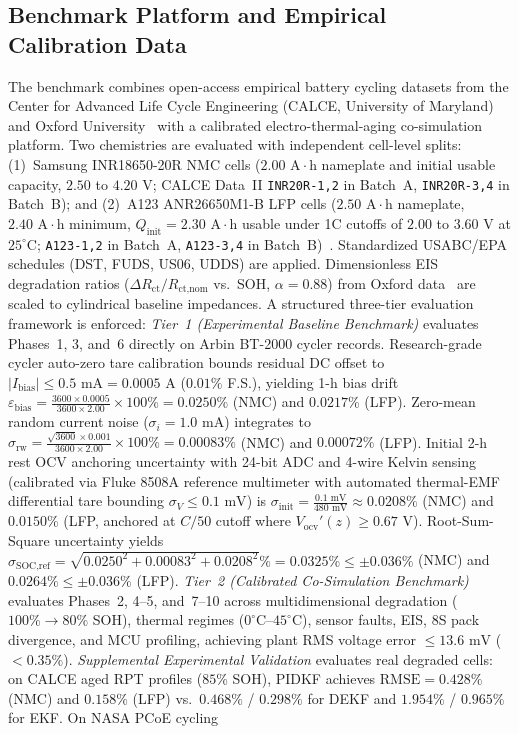 \documentclass[preprint,12pt]{elsarticle}
\begin{document}
\subsection{Benchmark Platform and Empirical Calibration Data}
The benchmark combines open-access empirical battery cycling datasets from the Center for Advanced Life Cycle Engineering (CALCE, University of Maryland)~\cite{Pecht2011calce} and Oxford University~\cite{Birkl2017diagnostics} with a calibrated electro-thermal-aging co-simulation platform. Two chemistries are evaluated with independent cell-level splits: (1)~Samsung INR18650-20R NMC cells ($2.00\text{ A}\cdot\text{h}$ nameplate and initial usable capacity, $2.50$ to $4.20\text{ V}$; CALCE Data~II \texttt{INR20R-1,2} in Batch~A, \texttt{INR20R-3,4} in Batch~B); and (2)~A123 ANR26650M1-B LFP cells ($2.50\text{ A}\cdot\text{h}$ nameplate, $2.40\text{ A}\cdot\text{h}$ minimum, $Q_{\text{init}} = \allowbreak 2.30\text{ A}\cdot\text{h}$ usable under 1C cutoffs of $2.00$ to $3.60\text{ V}$ at $25^\circ\text{C}$; \texttt{A123-1,2} in Batch~A, \texttt{A123-3,4} in Batch~B)~\cite{He2011ecm,Pecht2011calce}. Standardized USABC/EPA schedules (DST, FUDS, US06, UDDS) are applied. Dimensionless EIS degradation ratios ($\Delta R_{\text{ct}}/\allowbreak R_{\text{ct,nom}}$ vs.\ SOH, $\alpha=0.88$) from Oxford data~\cite{Birkl2017diagnostics} are scaled to cylindrical baseline impedances. A structured three-tier evaluation framework is enforced: \emph{Tier~1 (Experimental Baseline Benchmark)} evaluates Phases~1, 3, and~6 directly on Arbin BT-2000 cycler records. Research-grade cycler auto-zero tare calibration bounds residual DC offset to $|I_{\text{bias}}| \le 0.5\text{ mA} = 0.0005\text{ A}$ ($0.01\%$ F.S.), yielding 1-h bias drift $\varepsilon_{\text{bias}} = \frac{3600 \times 0.0005}{3600 \times 2.00} \times 100\% = 0.0250\%$ (NMC) and $0.0217\%$ (LFP). Zero-mean random current noise ($\sigma_i = 1.0\text{ mA}$) integrates to $\sigma_{\text{rw}} = \frac{\sqrt{3600} \times 0.001}{3600 \times 2.00} \times 100\% = 0.00083\%$ (NMC) and $0.00072\%$ (LFP). Initial 2-h rest OCV anchoring uncertainty with 24-bit ADC and 4-wire Kelvin sensing (calibrated via Fluke 8508A reference multimeter with automated thermal-EMF differential tare bounding $\sigma_V \le 0.1\text{ mV}$) is $\sigma_{\text{init}} = \frac{0.1\text{ mV}}{480\text{ mV}} \approx 0.0208\%$ (NMC) and $0.0150\%$ (LFP, anchored at $C/50$ cutoff where $V_{\text{ocv}}'(z) \ge 0.67\text{ V}$). Root-Sum-Square uncertainty yields $\sigma_{\text{SOC,ref}} = \sqrt{0.0250^2 + 0.00083^2 + 0.0208^2}\% = 0.0325\% \le \pm 0.036\%$ (NMC) and $0.0264\% \le \pm 0.036\%$ (LFP). \emph{Tier~2 (Calibrated Co-Simulation Benchmark)} evaluates Phases~2, 4--5, and~7--10 across multidimensional degradation ($100\%\to 80\%$ SOH), thermal regimes ($0^\circ\text{C}\text{--}45^\circ\text{C}$), sensor faults, EIS, 8S pack divergence, and MCU profiling, achieving plant RMS voltage error $\le 13.6\text{ mV}$ ($<0.35\%$). \emph{Supplemental Experimental Validation} evaluates real degraded cells: on CALCE aged RPT profiles ($85\%$ SOH), PIDKF achieves $\text{RMSE} = 0.428\%$ (NMC) and $0.158\%$ (LFP) vs.\ $0.468\%$ / $0.298\%$ for DEKF and $1.954\%$ / $0.965\%$ for EKF. On NASA PCoE cycling 
\end{document}
